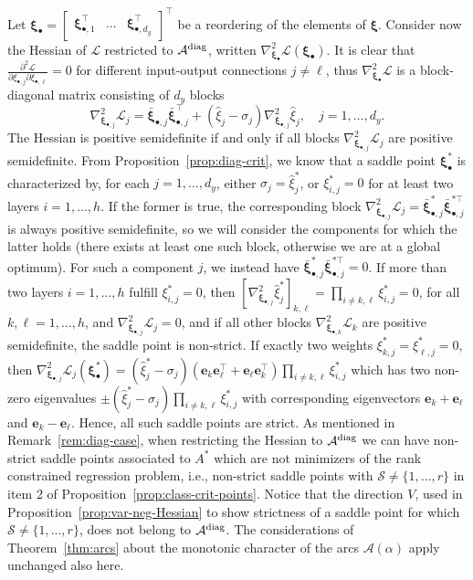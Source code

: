 \documentclass{article}
\def\diag{{\rm diag}}
\newcommand{\1}{\mathds{1}}
\newcommand{\beq}{\begin{equation}}
\newcommand{\eeq}{\end{equation}}
\begin{document}
Let $\bm{\xi}_\bullet = \begin{bmatrix} \bm{\xi}_{\bullet,1}^\top & \ldots & \bm{\xi}_{\bullet,d_y}^\top \end{bmatrix}^\top $ be a reordering of the elements of $\bm{\xi}$. Consider now the Hessian of $\mathcal{L}$ restricted to $ \mathcal{A}^{\diag} $, written $ \nabla_{\bm{\xi}_\bullet}^2 \mathcal{L} (\bm{\xi}_\bullet) $. It is clear that $\frac{\partial^2 \mathcal{L}}{\partial \xi_{\bullet,j} \partial \xi_{\bullet,\ell}} = 0$ for different input-output connections $j\neq \ell$, thus $ \nabla_{\bm{\xi}_\bullet}^2 \mathcal{L} $ is a block-diagonal matrix consisting of $d_y$ blocks
\beq
    \label{eq:Lj-hessian}
    \nabla_{\bm{\xi}_{\bullet,j}}^2 \mathcal{L}_j = \bar{\bm{\xi}}_{\bullet,j} \bar{\bm{\xi}}_{\bullet,j}^\top + (\hat{\xi}_j - \sigma_j) \nabla_{\bm{\xi}_{\bullet,j}}^2 \hat{\xi}_j, \quad j=1,\ldots,d_y.
\eeq
The Hessian is positive semidefinite if and only if all blocks $ \nabla_{\bm{\xi}_{\bullet,j}}^2 \mathcal{L}_j $ are positive semidefinite.
From Proposition~\ref{prop:diag-crit}, we know that a saddle point $ \bm{\xi}_\bullet^\ast $ is characterized by, for each $j=1,\ldots,d_y$, either $\sigma_j = \hat{\xi}_j^\ast$, or $ \xi_{i,j}^\ast =0 $ for at least two layers $ i=1, \ldots, h$. If the former is true, the corresponding block $\nabla_{\bm{\xi}_{\bullet,j}}^2 \mathcal{L}_j = \bar{\bm{\xi}}_{\bullet,j}^\ast \bar{\bm{\xi}}_{\bullet,j}^{\ast\top} $ is always positive semidefinite, so we will consider the components for which the latter holds (there exists at least one such block, otherwise we are at a global optimum). For such a component $j$, we instead have $\bar{\bm{\xi}}_{\bullet,j}^\ast \bar{\bm{\xi}}_{\bullet,j}^{\ast\top} = 0$.
If more than two layers $ i=1, \ldots, h$ fulfill $ \xi_{i,j}^\ast =0 $, then $ [ \nabla_{\bm{\xi}_{\bullet,j}}^2 \hat{\xi}_j^\ast ]_{k,\ell} = \prod_{i\neq k,\ell} \xi_{i,j}^\ast = 0$, for all $k,\ell=1,\ldots,h$, and $ \nabla_{\bm{\xi}_{\bullet,j}}^2 \mathcal{L}_j = 0 $, and if all other blocks $ \nabla_{\bm{\xi}_{\bullet,k}}^2 \mathcal{L}_k$ are positive semidefinite, the saddle point is non-strict.
If exactly two weights $ \xi_{k,j}^\ast = \xi_{\ell,j}^\ast =0 $, then $ \nabla_{\bm{\xi}_{\bullet,j}}^2 \mathcal{L}_j( \bm{\xi}_\bullet^\ast ) = (\hat{\xi}_j^\ast - \sigma_j)(\bm{e}_k \bm{e}_\ell^\top + \bm{e}_\ell \bm{e}_k^\top ) \prod_{i\neq k,\ell} \xi_{i,j}^\ast $ which has two non-zero eigenvalues $\pm (\hat{\xi}_j^\ast - \sigma_j) \prod_{i\neq k,\ell} \xi_{i,j}^\ast$ with corresponding eigenvectors $\bm{e}_k+\bm{e}_\ell$ and $\bm{e}_k-\bm{e}_\ell$. Hence, all such saddle points are strict.
As mentioned in Remark~\ref{rem:diag-case}, when restricting the Hessian to $ \mathcal{A}^\diag $ we can have non-strict saddle points associated to $A^\ast$ which are not minimizers of the rank constrained regression problem, i.e., non-strict saddle points with $\mathcal{S}\neq \{1,...,r\}$ in item 2 of Proposition~\ref{prop:class-crit-points}. Notice that the direction $V$, used in Proposition~\ref{prop:var-neg-Hessian} to show strictness of a saddle point for which $\mathcal{S}\neq \{1,...,r\}$, does not belong to $ \mathcal{A}^\diag $.
The considerations of Theorem~\ref{thm:arcs} about the monotonic character of the arcs $ \mathcal{A}(\alpha)$ apply unchanged also here. 
\end{document}

